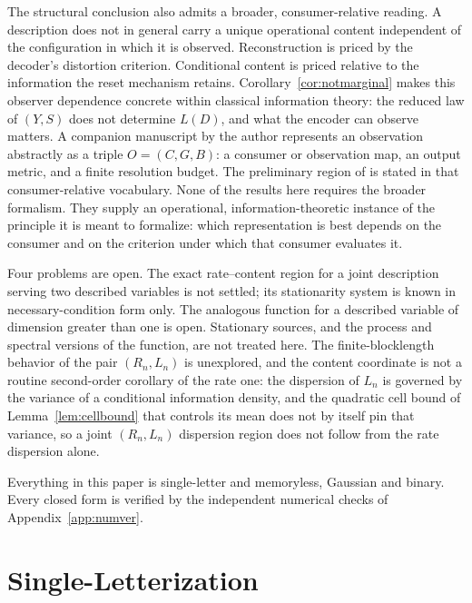 ﻿\documentclass[11pt,onecolumn]{IEEEtran}
\begin{document}
The structural conclusion also admits a broader, consumer-relative
reading. A description does not in general carry a unique operational
content independent of the configuration in which it is observed.
Reconstruction is priced by the decoder's distortion criterion.
Conditional content is priced relative to the information the reset
mechanism retains. Corollary~\ref{cor:notmarginal} makes this observer
dependence concrete within classical information theory: the reduced law
of $(Y,S)$ does not determine $L(D)$, and what the encoder can observe
matters. A companion manuscript by the author \cite{bond2026ot}
represents an observation abstractly as a triple $O=(C,G,B)$: a consumer
or observation map, an output metric, and a finite resolution budget.
The preliminary region of \cite{bond2026landauer} is stated in that
consumer-relative vocabulary. None of the results here requires the
broader formalism. They supply an operational, information-theoretic
instance of the principle it is meant to formalize: which representation
is best depends on the consumer and on the criterion under which that
consumer evaluates it.

Four problems are open. The exact rate--content region for a joint
description serving two described variables is not settled; its stationarity
system is known in necessary-condition form only. The analogous function for
a described variable of dimension greater than one is open. Stationary
sources, and the process and spectral versions of the function, are not
treated here. The finite-blocklength behavior of the pair $(R_n,L_n)$ is
unexplored, and the content coordinate is not a routine second-order
corollary of the rate one: the dispersion of $L_n$ is governed by the
variance of a conditional information density, and the quadratic cell
bound of Lemma~\ref{lem:cellbound} that controls its mean does not by
itself pin that variance, so a joint $(R_n,L_n)$ dispersion region does
not follow from the rate dispersion alone.

Everything in this paper is single-letter and memoryless, Gaussian and
binary. Every closed form is verified by the independent numerical checks of
Appendix~\ref{app:numver}.

\appendices
\section{Single-Letterization}
\label{app:converse}
\end{document}
